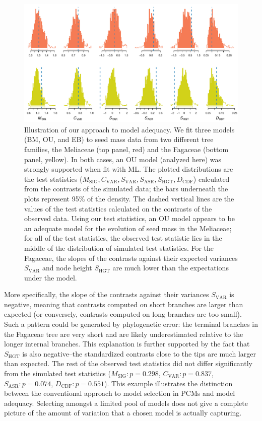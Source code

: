 \begin{figure}[p]
  \centering
  \includegraphics[width=\textwidth]{figs/two-clades}
  \caption[Seed mass evolution in Meliaceae and Fagaceae]{Illustration of our approach to model adequacy. We fit three models (BM, OU, and EB) to seed mass data from two different tree families, the Meliaceae (top panel, red) and the Fagaceae (bottom panel, yellow). In both cases, an OU model (analyzed here) was strongly supported when fit with ML. The plotted distributions are the test statistics ($M_{\text{SIG}}, C_{\text{VAR}}, S_{\text{VAR}}, S_{\text{ASR}}, S_{\text{HGT}}, D_{\text{CDF}}$) calculated from the contrasts of the simulated data; the bars underneath the plots represent 95\% of the density. The dashed vertical lines are the values of the test statistics calculated on the contrasts of the observed data. Using our test statistics, an OU model appears to be an adequate model for the evolution of seed mass in the Meliaceae; for all of the test statistics, the observed test statistic lies in the middle of the distribution of simulated test statistics. For the Fagaceae, the slopes of the contrasts against their expected variances $S_{\text{VAR}}$ and node height $S_{\text{HGT}}$ are much lower than the expectations under the model.}
  \label{fig:two-clades}
\end{figure}


More specifically, the slope of the contrasts against their variances $S_{\text{VAR}}$ is negative, meaning that contrasts computed on short branches are larger than expected (or conversely, contrasts computed on long branches are too small). Such a pattern could be generated by phylogenetic error: the terminal branches in the Fagaceae tree are very short and are likely underestimated relative to the longer internal branches. This explanation is further supported by the fact that $S_{\text{HGT}}$ is also negative--the standardized contrasts close to the tips are much larger than expected. The rest of the observed test statistics did not differ significantly from the simulated test statistics ($M_{\text{SIG}}: p=\text{0.298}$, $C_{\text{VAR}}:p=\text{0.837}$, $S_{\text{ASR}}:p=\text{0.074}$, $D_{\text{CDF}}: p=\text{0.551}$). This example illustrates the distinction between the conventional approach to model selection in PCMs and model adequacy. Selecting amongst a limited pool of models does not give a complete picture of the amount of variation that a chosen model is actually capturing.


